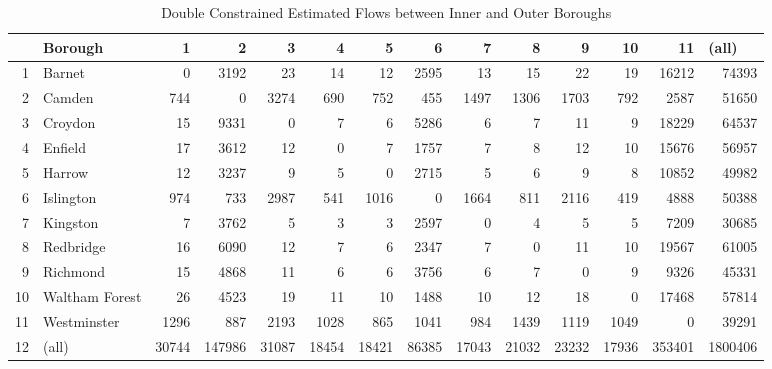 \documentclass[11pt]{article} %
\begin{document}
\begin{table}
\footnotesize
\caption{Double Constrained Estimated Flows between Inner and Outer Boroughs}
\begin{tabular}{|r|l|r|r|r|r|r|r|r|r|r|r|r|r|}
\hline
\multicolumn{1}{|l|}{} & Borough & 1 & 2 & 3 & 4 & 5 & 6 & 7 & 8 & 9 & 10 & 11 & \multicolumn{1}{l|}{(all)} \\ \hline
1 & Barnet & 0 & 3192 & 23 & 14 & 12 & 2595 & 13 & 15 & 22 & 19 & 16212 & 74393 \\ \hline
2 & Camden & 744 & 0 & 3274 & 690 & 752 & 455 & 1497 & 1306 & 1703 & 792 & 2587 & 51650 \\ \hline
3 & Croydon & 15 & 9331 & 0 & 7 & 6 & 5286 & 6 & 7 & 11 & 9 & 18229 & 64537 \\ \hline
4 & Enfield & 17 & 3612 & 12 & 0 & 7 & 1757 & 7 & 8 & 12 & 10 & 15676 & 56957 \\ \hline
5 & Harrow & 12 & 3237 & 9 & 5 & 0 & 2715 & 5 & 6 & 9 & 8 & 10852 & 49982 \\ \hline
6 & Islington & 974 & 733 & 2987 & 541 & 1016 & 0 & 1664 & 811 & 2116 & 419 & 4888 & 50388 \\ \hline
7 & Kingston & 7 & 3762 & 5 & 3 & 3 & 2597 & 0 & 4 & 5 & 5 & 7209 & 30685 \\ \hline
8 & Redbridge & 16 & 6090 & 12 & 7 & 6 & 2347 & 7 & 0 & 11 & 10 & 19567 & 61005 \\ \hline
9 & Richmond & 15 & 4868 & 11 & 6 & 6 & 3756 & 6 & 7 & 0 & 9 & 9326 & 45331 \\ \hline
10 & Waltham Forest & 26 & 4523 & 19 & 11 & 10 & 1488 & 10 & 12 & 18 & 0 & 17468 & 57814 \\ \hline
11 & Westminster & 1296 & 887 & 2193 & 1028 & 865 & 1041 & 984 & 1439 & 1119 & 1049 & 0 & 39291 \\ \hline
12 & (all) & 30744 & 147986 & 31087 & 18454 & 18421 & 86385 & 17043 & 21032 & 23232 & 17936 & 353401 & 1800406 \\ \hline
\end{tabular}
\label{Estimated Flows Double}
\end{table}



%
%
%
\end{document}
